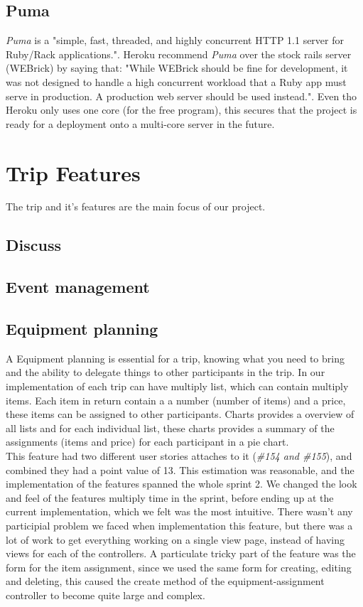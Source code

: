 \documentclass[a4paper]{article}
\begin{document}
\subsection{Puma}
\textit{Puma} is a "simple, fast, threaded, and highly concurrent HTTP 1.1 server for Ruby/Rack applications."\cite{puma}. Heroku recommend \textit{Puma} over the stock rails server (WEBrick) by saying that: "While WEBrick should be fine for development, it was not designed to handle a high concurrent workload that a Ruby app must serve in production. A production web server should be used instead."\cite{heroku_webserver}. Even tho Heroku only uses one core (for the free program), this secures that the project is ready for a deployment onto a multi-core server in the future.  


\section{Trip Features}
The trip and it's features are the main focus of our project. 
\subsection{Discuss}
\subsection{Event management}
\subsection{Equipment planning}
A Equipment planning is essential for a trip, knowing what you need to bring and the ability to delegate things to other participants in the trip. In our implementation of each trip can have multiply list, which can contain multiply items. Each item in return contain a a number (number of items) and a price, these items can be assigned to other participants. Charts provides a overview of all lists and for each individual list, these charts provides a summary of the assignments (items and price) for each participant in a pie chart. \\ This feature had two different user stories attaches to it (\emph{\#154 and \#155}), and combined they had a point value of 13. This estimation was reasonable, and the implementation of the features spanned the whole sprint 2. We changed the look and feel of the features multiply time in the sprint, before ending up at the current implementation, which we felt was the most intuitive. There wasn't any participial problem we faced when implementation this feature, but there was a lot of work to get everything working on a single view page, instead of having views for each of the controllers. A particulate tricky part of the feature was the form for the item assignment, since we used the same form for creating, editing and deleting, this caused the create method of the equipment-assignment controller to become quite large and complex. 
\end{document}
